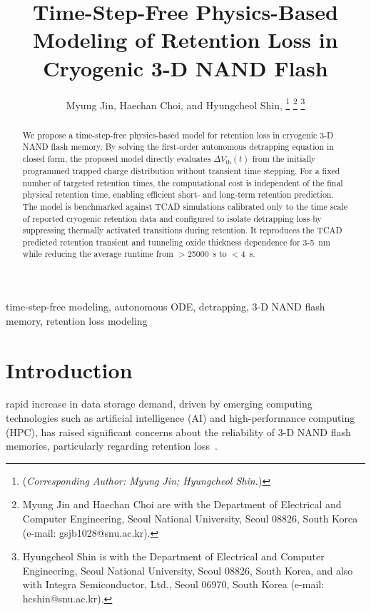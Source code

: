 \documentclass[journal,twoside,web]{ieeecolor}
\begin{document}
\linenumbers
\IEEEaftertitletext{\vspace{-1cm}} %
\title{Time-Step-Free Physics-Based Modeling of Retention Loss in Cryogenic 3-D NAND Flash}\author{Myung Jin, Haechan Choi, and Hyungcheol Shin, 
\thanks{(\textit{Corresponding Author: Myung Jin; Hyungcheol Shin.}) }
\thanks{Myung Jin and Haechan Choi are with the Department of Electrical and Computer Engineering, Seoul National University, Seoul 08826, South Korea (e-mail: gsjb1028@snu.ac.kr).}
\thanks{Hyungcheol Shin is with the Department of Electrical and Computer Engineering, Seoul National University, Seoul 08826, South Korea, and also with Integra Semiconductor, Ltd., Seoul 06970, South Korea (e-mail: hcshin@snu.ac.kr).}}

\maketitle
\begin{abstract}
We propose a time-step-free physics-based model for retention loss in cryogenic 3-D NAND flash memory.
By solving the first-order autonomous detrapping equation in closed form, the proposed model directly evaluates $\Delta V_\text{th}(t)$ from the initially programmed trapped charge distribution without transient time stepping.
For a fixed number of targeted retention times, the computational cost is independent of the final physical retention time, enabling efficient short- and long-term retention prediction.
The model is benchmarked against TCAD simulations calibrated {only} to the time scale of reported cryogenic retention data and configured to isolate detrapping loss by suppressing thermally activated transitions during retention.
It reproduces the TCAD predicted retention transient and tunneling oxide thickness dependence for 3-5~nm while reducing the average runtime from $>$25000~s to $<$4~s.
\end{abstract}

\begin{IEEEkeywords}
time-step-free modeling, autonomous ODE, detrapping, 3-D NAND flash memory, retention loss modeling
\end{IEEEkeywords}

\section{Introduction}
\label{sec:introduction}
 rapid increase in data storage demand, driven by emerging computing technologies such as artificial intelligence (AI) and high-performance computing (HPC), has raised significant concerns about the reliability of 3-D NAND flash memories, particularly regarding retention loss~\cite{agoda}.
\end{document}
